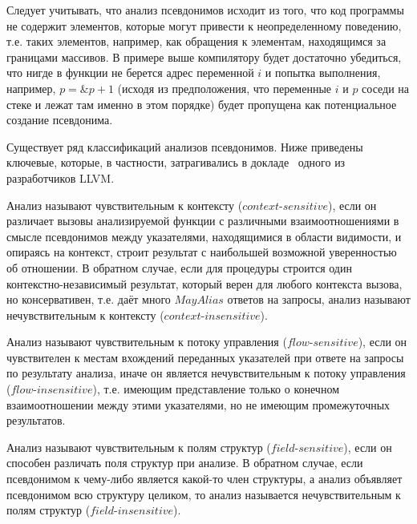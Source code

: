 \begin{myremark}
Следует учитывать, что анализ псевдонимов исходит из того, что код программы не содержит элементов, которые могут привести к неопределенному поведению, т.е. таких элементов, например, как обращения к элементам, находящимся за границами массивов. В примере выше компилятору будет достаточно убедиться, что нигде в функции не берется адрес переменной $i$ и попытка выполнения, например, $p = \&p + 1$ (исходя из предположения, что переменные $i$ и $p$ соседи на стеке и лежат там именно в этом порядке) будет пропущена как потенциальное создание псевдонима.
\end{myremark}


Существует ряд классификаций анализов псевдонимов. Ниже приведены ключевые, которые, в частности, затрагивались в докладе~\autocite{GohmanAAinLLVM} одного из разработчиков LLVM.

\begin{mydefinition}
Анализ называют чувствительным к контексту ($context$-$sensitive$), если он различает вызовы анализируемой функции с различными взаимоотношениями в смысле псевдонимов между указателями, находящимися в области видимости, и опираясь на контекст, строит результат с наибольшей возможной уверенностью об отношении. В обратном случае, если для процедуры строится один контекстно-независимый результат, который верен для любого контекста вызова, но консервативен, т.е. даёт много $MayAlias$ ответов на запросы, анализ называют нечувствительным к контексту ($context$-$insensitive$).
\end{mydefinition}

\begin{mydefinition}
Анализ называют чувствительным к потоку управления ($flow$-$sensitive$), если он чувствителен к местам вхождений переданных указателей при ответе на запросы по результату анализа, иначе он является нечувствительным к потоку управления ($flow$-$insensitive$), т.е. имеющим представление только о конечном взаимоотношении между этими указателями, но не имеющим промежуточных результатов.
\end{mydefinition}

\begin{mydefinition}
Анализ называют чувствительным к полям структур ($field$-$sensitive$), если он способен различать поля структур при анализе. В обратном случае, если псевдонимом к чему-либо является какой-то член структуры, а анализ объявляет псевдонимом всю структуру целиком, то анализ называется нечувствительным к полям структур ($field$-$insensitive$).
\end{mydefinition}

